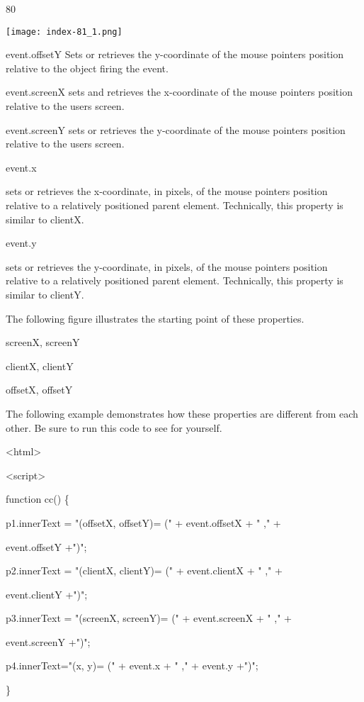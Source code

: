 \documentclass[
]{article}
\begin{document}
80

\protect\hypertarget{index_split_006.htmlux5cux23p81}{}{}\texttt{[image: index-81\_1.png]}

event.offsetY Sets or retrieves the y-coordinate of the mouse
pointer\textquotesingle s position relative to the object firing the
event.

event.screenX sets and retrieves the x-coordinate of the mouse
pointer\textquotesingle s position relative to the
user\textquotesingle s screen.

event.screenY sets or retrieves the y-coordinate of the mouse
pointer\textquotesingle s position relative to the
user\textquotesingle s screen.

event.x

sets or retrieves the x-coordinate, in pixels, of the mouse
pointer\textquotesingle s position relative to a relatively positioned
parent element. Technically, this property is similar to clientX.

event.y

sets or retrieves the y-coordinate, in pixels, of the mouse
pointer\textquotesingle s position relative to a relatively positioned
parent element. Technically, this property is similar to clientY.

The following figure illustrates the starting point of these properties.

screenX, screenY

clientX, clientY

offsetX, offsetY

The following example demonstrates how these properties are different
from each other. Be sure to run this code to see for yourself.

\textless html\textgreater{}

\textless script\textgreater{}

function cc() \{

p1.innerText = "(offsetX, offsetY)= (" + event.offsetX + " ," +

event.offsetY +")";

p2.innerText = "(clientX, clientY)= (" + event.clientX + " ," +

event.clientY +")";

p3.innerText = "(screenX, screenY)= (" + event.screenX + " ," +

event.screenY +")";

p4.innerText="(x, y)= (" + event.x + " ," + event.y +")";

\}
\end{document}
